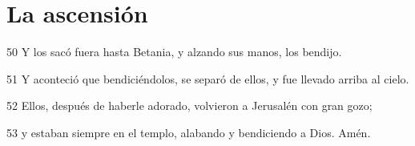 \section*{La ascensión}

\par 50 Y los sacó fuera hasta Betania, y alzando sus manos, los bendijo.
\par 51 Y aconteció que bendiciéndolos, se separó de ellos, y fue llevado arriba al cielo.
\par 52 Ellos, después de haberle adorado, volvieron a Jerusalén con gran gozo;
\par 53 y estaban siempre en el templo, alabando y bendiciendo a Dios. Amén.

